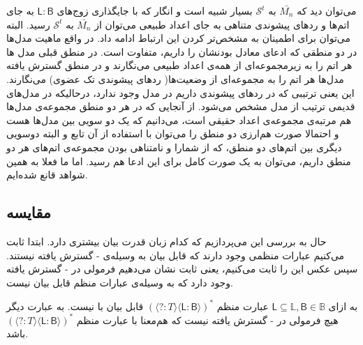 می‌توان دید که $\bar{M_n}$ به
$\mathcal{S}^t$
بسیار شبیه است و انگار که با جایگذاری زوج‌های 
$\mathsf{L:B}$ به جای اتم‌ها و ردهای پیشوندی متناهی به جای اعداد طبیعی می‌توان 
از 
$\bar{M_n}$
به 
$\mathcal{S}^t$
رسید. البته می‌توان برای اطمینان به مشخص‌تر کردن این ارتباط ادامه داد. در واقع ماهیت مدل‌ها در دو منطقی که ادعای معادل بودنشان را داریم، متفاوت است. در منطق قبلی مدل ها هر اتم را به زیرمجموعه‌ای از همه‌ی اعداد طبیعی می‌نگارند و در منطق گسترش یافته مدل‌ها هر اتم را به مجموعه‌ای از وضعیت‌ها( ردهای پیشوندی تک عضوی) می‌نگارند. این یعنی ترتیبی که در ردهای پیشوندی داریم در مدل وجود ندارد، درحالیکه در مدل‌های قدیمی ترتیب از مدل مشخص می‌شود. از آنجایی که در هر دو منطق مجموعه‌ی مدل‌ها هم مرتبه‌ی مجموعه‌ی اعداد حقیقی است، می‌دانیم که یک دو سویی بین مدل‌ها هست و احتمالا صورت هم‌ارزی دو منطق را می‌توان با استفاده از آن تابع و البته دوسویی دیگری بین اتم‌های دو منطق، که از شمارا و نامتناهی بودن مجموعه‌ی اتم‌های هر دو منطق داریم، می‌توان به یک صورت کامل برای این ادعا هم رسید. اما ما فعلا به همین شواهد قانع شده‌ایم.

\subsection{مقایسه}

حال به بررسی این می‌پردازیم که کدام زبان قدرت بیان بیشتری دارد. ابتدا ثابت می‌کنیم عبارات منظمی وجود دارند که قابل بیان به وسیله‌ی - گسترش یافته نیستند. سپس عکس این را ثابت می‌کنیم، یعنی ثابت نشان می‌دهیم فرمولی در - گسترش یافته وجود دارد که به وسیله‌ی عبارات منظم قابل بیان نیست. 

\begin{thm}
	به ازای 
	$\mathsf{L} \subseteq \mathbb{L},\mathsf{B}\in \mathbb{B}$
	عبارت منظم 
	$(\mathsf{\langle ? : \mathit{T} \rangle \langle L:B \rangle })^*$
	قابل بیان با  نیست. به عبارت دیگر هیچ فرمولی در - گسترش یافته نیست که هم‌معنا با عبارت منظم 
	$(\mathsf{\langle ? : \mathit{T} \rangle \langle L:B \rangle })^*$
	 باشد.
\end{thm}

